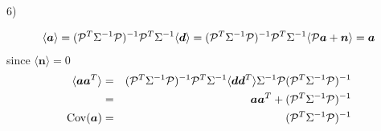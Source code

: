 \documentclass[a4paper]{article}
\def\ba{\begin{eqnarray}}
\def\ea{\end{eqnarray}}
\begin{document}
6)

\ba
\langle  \bm{a}  \rangle= ( {\cal P}^{T}  \Sigma^{-1}{\cal P})^{-1}{\cal P}^{T}  \Sigma^{-1} \langle \bm{d} \rangle =  ( {\cal P}^{T}  \Sigma^{-1}{\cal P})^{-1}{\cal P}^{T}  \Sigma^{-1} \langle  {\cal P}\bm{a} + \bm{n} \rangle  = \bm{a}
\ea
since $\langle  \bm{n} \rangle=0$
\ba
\langle  \bm{a} \bm{a}^{T}  \rangle &=& ( {\cal P}^{T}  \Sigma^{-1}{\cal P})^{-1}{\cal P}^{T}  \Sigma^{-1} \langle \bm{d}  \bm{d}^{T} \rangle  \Sigma^{-1}{\cal P} ( {\cal P}^{T}  \Sigma^{-1}{\cal P})^{-1} \nonumber \\
&=&   \bm{a} \bm{a}^{T}   +  ( {\cal P}^{T}  \Sigma^{-1}{\cal P})^{-1} \nonumber \\
{\rm Cov}(\bm{a}) &=&  ( {\cal P}^{T}  \Sigma^{-1}{\cal P})^{-1}
\ea
\end{document}
